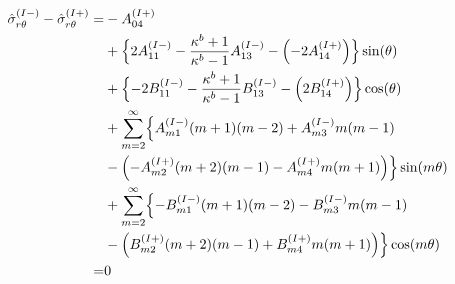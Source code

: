 \begin{align}
	\hat{\sigma}_{r\theta}^{(I-)}-\hat{\sigma}_{r\theta}^{(I+)} =
	&-A_{04}^{(I+)}
	\nonumber
	\\
	&+\Bigl\{2A_{11}^{(I-)}-\frac{\kappa^{b}+1}{\kappa^{b}-1}A_{13}^{(I-)}
	-\Bigl(-2A_{14}^{(I+)}\Bigr)\Bigr\}\sin(\theta)
	\nonumber
	\\
	&+\Bigl\{-2B_{11}^{(I-)}-\frac{\kappa^{b}+1}{\kappa^{b}-1}B_{13}^{(I-)}
	-\Bigl(2B_{14}^{(I+)}\Bigr)\Bigr\}\cos(\theta)
	\nonumber
	\\
	&+\sum_{m=2}^{\infty}\Bigl\{
 	A_{m1}^{(I-)}(m+1)(m-2)+A_{m3}^{(I-)}m(m-1)
	\nonumber
	\\
	&-\Bigl(-A_{m2}^{(I+)}(m+2)(m-1)-A_{m4}^{(I+)}m(m+1)\Bigr)
	\Bigr\}\sin(m\theta)
	\nonumber
	\\
	&+\sum_{m=2}^{\infty}\Bigl\{
	-B_{m1}^{(I-)}(m+1)(m-2)-B_{m3}^{(I-)}m(m-1)
	\nonumber
	\\
	&-\Bigl(B_{m2}^{(I+)}(m+2)(m-1)+B_{m4}^{(I+)}m(m+1)\Bigr)
	\Bigr\}\cos(m\theta)
	\nonumber
	\\
	=&0
	\label{eq:SigmaRTh1eq}
\end{align}

\newpage